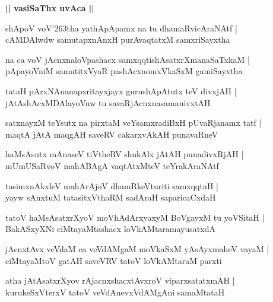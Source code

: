 \documentclass[twoside,12pt,openright]{book}
\def\S{\char'263}
\newcounter{shloka}[chapter]
\def\uvaca#1{\centerline{{\large\textbf{#1}}}}
\begin{document}
\uvaca{|| vasiSaThx uvAca ||}

\begin{shloka}%
shApoV voV\S tha yathApApamx na tu dhamaRvicAraNAtf |\\
cAMDAlwdw samutapxnAnxH purAvaqtatxM samxriSayxtha 
\end{shloka}

\begin{shloka}%
na ca voV jAcnxnaloVpashacx samxqqtishAsatxrXmanaSaTxkaM |\\
pApayoVniM samutitxVyaR pashAcxnomxVkaSxM gamiSayxtha 
\end{shloka}

\begin{shloka}%
tataH pArxNAnanapxritayxjayx gurushApAtutx teV divxjAH |\\
jAtAshAcxMDAlayoVnw tu savaRjAcnxnasamanivxtAH 
\end{shloka}

\begin{shloka}%
satxnayxM teYsutx na pirxtaM veYsamxradiBxH pUvaRjanamx tatf |\\
maqtA jAtA maqgAH saveRV cakarxvAkAH punavaRneV 
\end{shloka}

\begin{shloka}%
haMsAsutx mAnaseV tiVtheRV shukAlx jAtAH punadivxRjAH |\\
mUmUSaRvoV mahABAgA vaqtAtxMteV teYrakAraNAtf 
\end{shloka}

\begin{shloka}%
tasimxnAkxleV mahArAjoV dhamRkeVturiti samxqqtaH |\\
yayw sAnxtuM tatasitxVthaRM sadAraH saparicaCxdaH 
\end{shloka}

\begin{shloka}%
tatoV haMsAsatxrXyoV moVhAdArxyaxyM BoVgayxM tu yoVSitaH |\\
BakASxyXNi ciMtayaMtashacx loVkAMtaramayusatxdA 
\end{shloka}

\begin{shloka}%
jAcnxtAvx veVdaM ca veVdAMgaM moVkaSxM yAsAyxmaheV vayaM |\\
ciMtayaMtoV gatAH saveVRV tatoV loVkAMtaraM parxti
\end{shloka}

\begin{shloka}%
atha jAtAsatxrXyov rAjacnxshacxtAvxroV viparxsatatxmAH |\\
kurukeSxVterxV tatoV veVdAnevxVdAMgAni samaMtataH  
\end{shloka}
\end{document}
